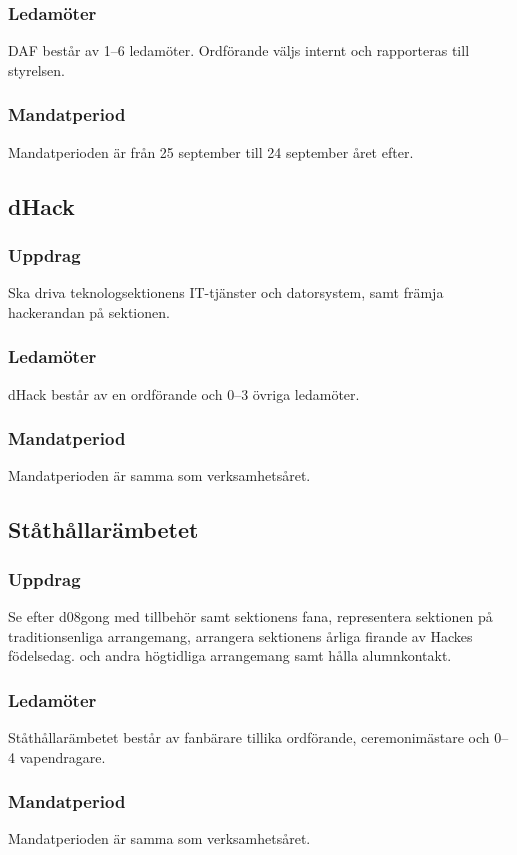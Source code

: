 \subsubsection{Ledamöter}
DAF består av 1--6 ledamöter. Ordförande väljs internt och rapporteras till styrelsen.
\subsubsection{Mandatperiod}
Mandatperioden är från 25 september till 24 september året efter.

\subsection{dHack}
\subsubsection{Uppdrag}
Ska driva teknologsektionens IT-tjänster och datorsystem, samt
främja hackerandan på sektionen.
\subsubsection{Ledamöter}
dHack består av en ordförande och 0--3 övriga ledamöter.
\subsubsection{Mandatperiod}
Mandatperioden är samma som verksamhetsåret.

\subsection{Ståthållarämbetet}
\subsubsection{Uppdrag}
Se efter d08gong med tillbehör samt sektionens fana, representera sektionen på traditionsenliga arrangemang, arrangera sektionens årliga firande av Hackes födelsedag.
och andra högtidliga arrangemang samt hålla alumnkontakt.
\subsubsection{Ledamöter}
  Ståthållarämbetet består av fanbärare tillika ordförande, ceremonimästare och 0--4 vapendragare.
\subsubsection{Mandatperiod}
Mandatperioden är samma som verksamhetsåret. 

